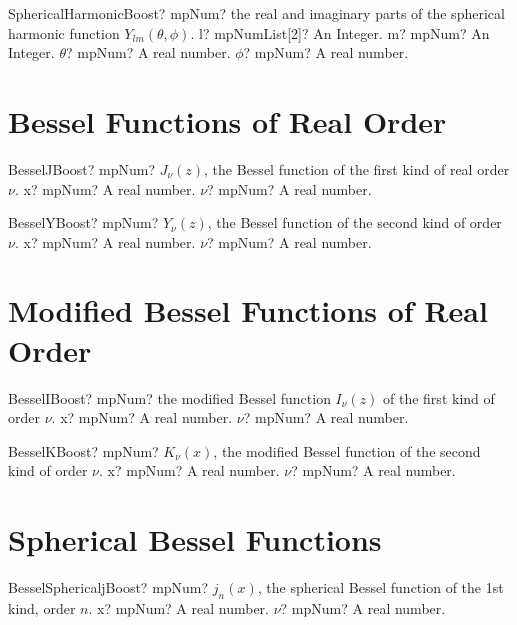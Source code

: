 \documentclass[12pt,a4paper,openany]{book}
\begin{document}
\begin{mpFunctionsExtract}
\mpFunctionFour
{SphericalHarmonicBoost? mpNum? the real and imaginary parts of the spherical harmonic function $Y_{lm}(\theta, \phi)$.}
{l? mpNumList[2]? An Integer.}
{m? mpNum? An Integer.}
{$\theta$? mpNum? A real number.}
{$\phi$? mpNum? A real number.}
\end{mpFunctionsExtract}

\section{Bessel Functions of Real Order}

\begin{mpFunctionsExtract}
\mpFunctionTwo
{BesselJBoost? mpNum? $J_{\nu}(z)$, the Bessel function of the first kind of real order $\nu$.}
{x? mpNum? A real number.}
{$\nu$? mpNum? A real number.}
\end{mpFunctionsExtract}

\begin{mpFunctionsExtract}
\mpFunctionTwo
{BesselYBoost? mpNum? $Y_{\nu}(z)$, the Bessel function of the second kind of order $\nu$.}
{x? mpNum? A real number.}
{$\nu$? mpNum? A real number.}
\end{mpFunctionsExtract}

\section{Modified Bessel Functions of Real Order}

\begin{mpFunctionsExtract}
\mpFunctionTwo
{BesselIBoost? mpNum? the modified Bessel function $I_{\nu}(z)$ of the first kind of order $\nu$.}
{x? mpNum? A real number.}
{$\nu$? mpNum? A real number.}
\end{mpFunctionsExtract}

\begin{mpFunctionsExtract}
\mpFunctionTwo
{BesselKBoost? mpNum? $K_{\nu}(x)$, the modified Bessel function of the second kind of order $\nu$.}
{x? mpNum? A real number.}
{$\nu$? mpNum? A real number.}
\end{mpFunctionsExtract}

\section{Spherical Bessel Functions}

\begin{mpFunctionsExtract}
\mpFunctionTwo
{BesselSphericaljBoost? mpNum? $j_n(x)$, the spherical Bessel function of the 1st kind, order $n$.}
{x? mpNum? A real number.}
{$\nu$? mpNum? A real number.}
\end{mpFunctionsExtract}
\end{document}
